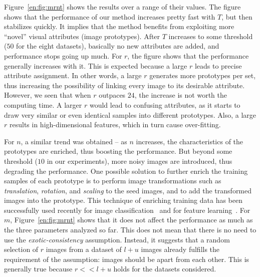 Figure~\ref{en:fig:mrnt} shows the results over a range of their
values. The figure shows that the performance of our method increases
pretty fast with $T$, but then stabilizes quickly. It implies that the
method benefits from exploiting more ``novel'' visual attributes
(image prototypes). After $T$ increases to some threshold (\eg $50$
for the eight datasets), basically no new attributes are added, and performance stops going up much. 
For $r$, the
figure shows that the performance generally increases with it. This is
expected because a large $r$ leads to precise attribute
assignment. In other words, a large $r$ generates more
prototypes per set, thus increasing the possibility of linking every
image to its desirable attribute.  However, we seen that when $r$
outpaces $24$, the increase is not worth the computing time. A larger
$r$ would lead to confusing attributes, as it starts to draw very
similar or even identical samples into different prototypes.  Also, a
large $r$ results in high-dimensional features, which in turn
cause over-fitting. 

For $n$, a similar trend was obtained -- as $n$ increases, the
characteristics of the prototypes are enriched, thus boosting the
performance. But beyond some threshold (\eg $10$ in our experiments),
more noisy images are introduced, thus degrading the performance. One
possible solution to further enrich the training samples of each
prototype is to perform image transformations such as
\emph{translation}, \emph{rotation}, and \emph{scaling} to the seed
images, and to add the transformed images into the prototype. This
technique of enriching training data has been successfully used
recently for image classification~\citep{transformation:cvpr14} and for feature learning~\citep{cnnfet14}.  For $m$, Figure~\ref{en:fig:mrnt} shows
that it does not affect the performance as much as the three parameters
analyzed so far. This does not mean that there is no need to use the
\emph{exotic-consistency} assumption. Instead, it suggests that a
random selection of $r$ images from a dataset of $l+u$ images already
fulfills the requirement of the assumption: images should be apart
from each other.  This is generally true because $r << l+u$ holds for
the datasets considered.
  


